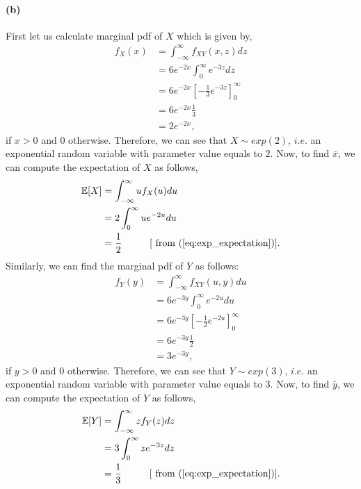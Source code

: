 \paragraph{(b)}First let us calculate marginal pdf of $X$ which is given by,
\begin{align}\label{eq:q2_x_marginal_pdf}
	f_X(x) &= \int_{-\infty}^{\infty}f_{XY}(x,z) dz \nonumber\\
	&= 6e^{-2x}\int_{0}^{\infty}e^{-3z}dz \nonumber\\
	&= 6e^{-2x}\left[-\frac{1}{3}e^{-3z}\right]_0^{\infty} \nonumber\\
	&= 6e^{-2x}\frac{1}{3} \nonumber\\
	&= 2e^{-2x},
\end{align}
if $x >0$ and $0$ otherwise. Therefore, we can see that $X \sim exp(2)$, $i.e.$ an exponential random variable with parameter value equals to $2$. Now, to find $\bar{x}$, we can compute the expectation of $X$ as follows,
\begin{align}\label{eq:q2_x_mean}
	\mathbb{E}[X] &= \int_{-\infty}^{\infty} uf_X(u)du \nonumber\\
	&= 2\int_{0}^{\infty}ue^{-2u}du \nonumber\\
	&= \frac{1}{2}\hspace{1cm} [\text{ from }(\ref{eq:exp_expectation})].
\end{align}
Similarly, we can find the marginal pdf of $Y$ as follows:
\begin{align}\label{eq:q2_y_marginal_pdf}
	f_Y(y) &= \int_{-\infty}^{\infty}f_{XY}(u,y) du \nonumber\\
	&= 6e^{-3y}\int_{0}^{\infty}e^{-2u}du \nonumber\\
	&= 6e^{-3y}\left[-\frac{1}{2}e^{-2u}\right]_0^{\infty} \nonumber\\
	&= 6e^{-3y}\frac{1}{2} \nonumber\\
	&= 3e^{-3y},
\end{align}
if $y >0$ and $0$ otherwise. Therefore, we can see that $Y \sim exp(3)$, $i.e.$ an exponential random variable with parameter value equals to $3$. Now, to find $\bar{y}$, we can compute the expectation of $Y$ as follows,
\begin{align}\label{eq:q2_y_mean}
	\mathbb{E}[Y] &= \int_{-\infty}^{\infty} zf_Y(z)dz \nonumber\\
	&= 3\int_{0}^{\infty}ze^{-3z}dz \nonumber\\
	&= \frac{1}{3}\hspace{1cm} [\text{ from }(\ref{eq:exp_expectation})].
\end{align}

